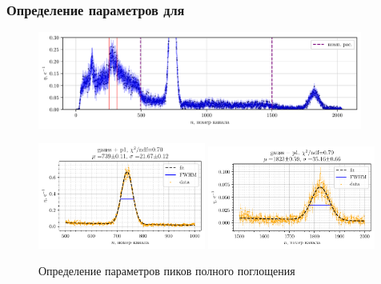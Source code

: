 \subsubsection*{Определение параметров для \na}
\vspace{-5mm}

\begin{figure}[h!]
    \centering
    \includegraphics[width=0.95\textwidth]{figures/na_0.pdf}
\end{figure}

\vspace{-5mm}

\begin{figure}[h!]
    \centering
    \includegraphics[width=0.49\textwidth]{figures/na_p1.pdf}
    \includegraphics[width=0.49\textwidth]{figures/na_p2.pdf}
    \vspace{-2mm}
    \caption{Определение параметров пиков полного поглощения \na}
\end{figure}

\vspace{-5mm}

